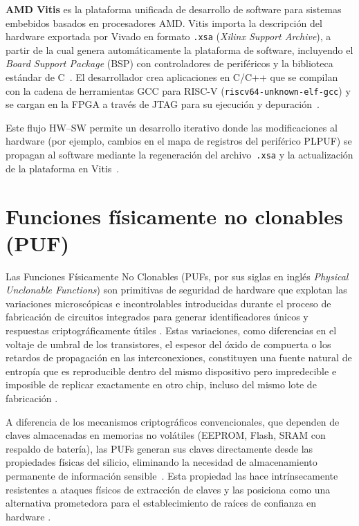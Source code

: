 \textbf{AMD Vitis} es la plataforma unificada de desarrollo de software para
sistemas embebidos basados en procesadores AMD. Vitis importa la descripción
del hardware exportada por Vivado en formato \texttt{.xsa} (\textit{Xilinx
Support Archive}), a partir de la cual genera automáticamente la plataforma
de software, incluyendo el \textit{Board Support Package} (BSP) con
controladores de periféricos y la biblioteca estándar de
C~\cite{ug1701}. El desarrollador crea aplicaciones en C/C++ que se compilan
con la cadena de herramientas GCC para RISC-V (\texttt{riscv64-unknown-elf-gcc})
y se cargan en la FPGA a través de JTAG para su ejecución y
depuración~\cite{ug1701}.

Este flujo HW--SW permite un desarrollo iterativo donde las modificaciones al
hardware (por ejemplo, cambios en el mapa de registros del periférico PLPUF)
se propagan al software mediante la regeneración del archivo~\texttt{.xsa} y
la actualización de la plataforma en Vitis~\cite{ug994, ug1701}.

\section{Funciones físicamente no clonables (PUF)}
\label{sec:puf}

Las Funciones Físicamente No Clonables (PUFs, por sus siglas en inglés
\textit{Physical Unclonable Functions}) son primitivas de seguridad de
hardware que explotan las variaciones microscópicas e incontrolables
introducidas durante el proceso de fabricación de circuitos integrados para
generar identificadores únicos y respuestas criptográficamente útiles
\cite{shamsoshoara_2020_puf, handschuh_2011_hardware}. Estas variaciones, como diferencias en el voltaje de umbral de los transistores, el espesor del
óxido de compuerta o los retardos de propagación en las
interconexiones, constituyen una fuente natural de entropía que es
reproducible dentro del mismo dispositivo pero impredecible e imposible de
replicar exactamente en otro chip, incluso del mismo lote de fabricación
\cite{anandakumar_2021_fpgapufs, sudhanya_2016_silicon}.

A diferencia de los mecanismos criptográficos convencionales, que dependen de
claves almacenadas en memorias no volátiles (EEPROM, Flash, SRAM con
respaldo de batería), las PUFs generan sus claves directamente desde las
propiedades físicas del silicio, eliminando la necesidad de almacenamiento
permanente de información sensible~\cite{hou_2019_lightweight, handschuh_2011_hardware}. Esta propiedad las hace intrínsecamente resistentes a
ataques físicos de extracción de claves y las posiciona como una alternativa
prometedora para el establecimiento de raíces de confianza en hardware
\cite{shamsoshoara_2020_puf}.

